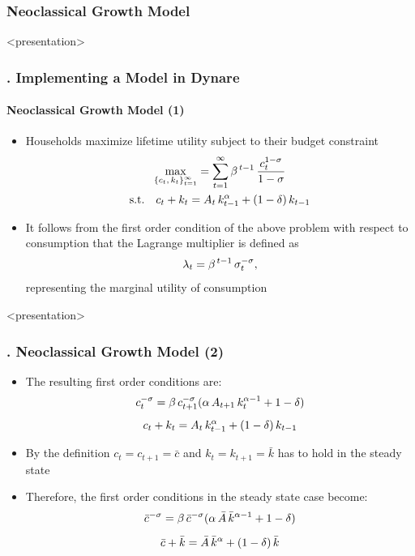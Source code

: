 \documentclass[11pt,aspectratio=169]{beamer}
\begin{document}
\subsubsection{Neoclassical Growth Model}
\begin{frame}<presentation>
\frametitle{{\thesection.\thesubsection} Implementing a Model in Dynare}
\framesubtitle{Neoclassical Growth Model (1)}

	 \begin{itemize}
	 	\item Households maximize lifetime utility subject to their budget constraint 
	 	\begin{gather*}
	 	\underset{\left\{ c_t, \thinspace k_t\right\} _{t=1}^{\infty}}{\max} = \sum_{t=1}^{\infty} \beta^{\thinspace t-1} \thinspace \frac{c_t^{1-\sigma}}{1-\sigma}\\
	 	\text{s.t.} \quad c_t + k_t = A_t \thinspace k_{t-1}^{\alpha} + (1-\delta) \thinspace k_{t-1}
	 	\end{gather*}
	 	\item It follows from the first order condition of the above problem with respect to consumption that the Lagrange multiplier is defined as  $$\lambda_t=\beta^{\thinspace t-1}\thinspace\sigma_t^{-\sigma},$$ representing the marginal utility of consumption
	\end{itemize}
\end{frame}
\begin{frame}<presentation>
	\frametitle{{\thesection.\thesubsection \thinspace\thesubsubsection} Neoclassical Growth Model (2)}
	\begin{itemize}
		\item The resulting first order conditions are:
		\begin{gather*}
		c_t^{-\sigma} = \beta \thinspace c_{t+1}^{-\sigma} (\alpha \thinspace A_{t+1} \thinspace k_t^{\alpha -1} + 1 - \delta)\\[5pt]
		c_t + k_t = A_t \thinspace k_{t-1}^\alpha + (1-\delta) \thinspace k_{t-1}
		\end{gather*}
		\item By the definition $c_t=c_{t+1}=\bar{c}$ and $k_t=k_{t+1}=\bar{k}$ has to hold in the steady state
		\item Therefore, the first order conditions in the steady state case become:
		\begin{gather*}
		\bar{c}^{-\sigma} = \beta \thinspace \bar{c}^{-\sigma} (\alpha \thinspace \bar{A} \thinspace \bar{k}^{\alpha -1} + 1 - \delta)\\[5pt]
		\bar{c} + \bar{k} = \bar{A} \thinspace \bar{k}^\alpha + (1-\delta) \thinspace \bar{k}
		\end{gather*}
	\end{itemize}
\end{frame}
\end{document}
